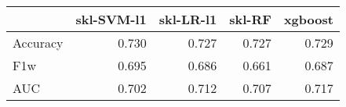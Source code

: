 \begin{tabular}{lrrrr}
\toprule
{} &  skl-SVM-l1 &  skl-LR-l1 &  skl-RF &  xgboost \\
\midrule
Accuracy &       0.730 &      0.727 &   0.727 &    0.729 \\
F1w      &       0.695 &      0.686 &   0.661 &    0.687 \\
AUC      &       0.702 &      0.712 &   0.707 &    0.717 \\
\bottomrule
\end{tabular}
